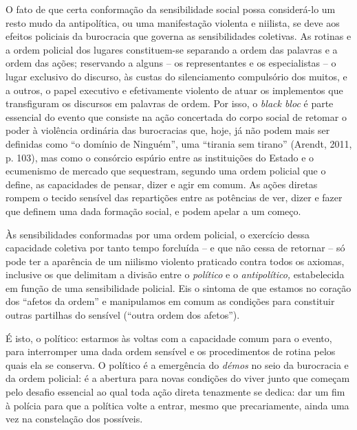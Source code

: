 O fato de que certa conformação da sensibilidade social possa
considerá-lo um resto mudo da antipolítica, ou uma manifestação violenta
e niilista, se deve aos efeitos policiais da burocracia que governa as
sensibilidades coletivas. As rotinas e a ordem policial dos lugares
constituem-se separando a ordem das palavras e a ordem das ações;
reservando a alguns -- os representantes e os especialistas -- o lugar
exclusivo do discurso, às custas do silenciamento compulsório dos
muitos, e a outros, o papel executivo e efetivamente violento de atuar
os implementos que transfiguram os discursos em palavras de ordem. Por
isso, o \emph{black bloc} é parte essencial do evento que consiste na
ação concertada do corpo social de retomar o poder à violência ordinária
das burocracias que, hoje, já não podem mais ser definidas como ``o
domínio de Ninguém'', uma ``tirania sem tirano'' (Arendt, 2011, p. 103),
mas como o consórcio espúrio entre as instituições do Estado e o
ecumenismo de mercado que sequestram, segundo uma ordem policial que o
define, as capacidades de pensar, dizer e agir em comum. As ações
diretas rompem o tecido sensível das repartições entre as potências de
ver, dizer e fazer que definem uma dada formação social, e podem apelar
a um começo.

Às sensibilidades conformadas por uma ordem policial, o exercício dessa
capacidade coletiva por tanto tempo forcluída -- e que não cessa de
retornar -- só pode ter a aparência de um niilismo violento praticado
contra todos os axiomas, inclusive os que delimitam a divisão entre o
\emph{político }e o\emph{ antipolítico,} estabelecida em função de uma
sensibilidade policial. Eis o sintoma de que estamos no coração dos
``afetos da ordem'' e manipulamos em comum as condições para constituir
outras partilhas do sensível (``outra ordem dos afetos'').

É isto, o político: estarmos às voltas com a capacidade comum para o
evento, para interromper uma dada ordem sensível e os procedimentos de
rotina pelos quais ela se conserva. O político é a emergência do
\emph{démos} no seio da burocracia e da ordem policial: é a abertura
para novas condições do viver junto que começam pelo desafio essencial
ao qual toda ação direta tenazmente se dedica: dar um fim à polícia para
que a política volte a entrar, mesmo que precariamente, ainda uma vez na
constelação dos possíveis.

